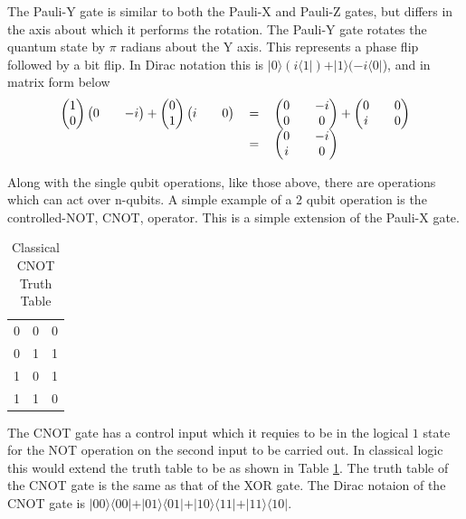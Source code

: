 \documentclass[authoryearcitations]{UoYCSproject}
\begin{document}
The Pauli-Y gate is similar to both the Pauli-X and Pauli-Z gates, but differs in the axis about which it performs the rotation.
The Pauli-Y gate rotates the quantum state by $\pi$ radians about the Y axis.
This represents a phase flip followed by a bit flip.
In Dirac notation this is $\vert0\rangle
(i\langle1\vert) + \vert1\rangle(-i\langle0\vert$), and in matrix form below
\begin{equation}
\begin{tabular}{ r c l }
\(\begin {pmatrix}
1 \\
0
\end{pmatrix}
\begin {pmatrix}
0 &&
-i
\end{pmatrix}
 + 
\begin {pmatrix}
0 \\
1
\end{pmatrix}
\begin {pmatrix}
i &&
0
\end{pmatrix}\)
& \(=\)
& \( 
\begin{pmatrix}
0 && -i \\
0 && 0
\end{pmatrix}
 + 
\begin{pmatrix}
0 && 0\\
i && 0
\end{pmatrix}
\) \\
& \(=\)
& \( 
\begin{pmatrix}
0 && -i \\
i && 0
\end{pmatrix}
\)
\end{tabular}
\end{equation}

Along with the single qubit operations, like those above, there are operations which can act over n-qubits.
A simple example of a 2 qubit operation is the controlled-NOT, CNOT, operator.
This is a simple extension of the Pauli-X gate.
\begin{table}
\centering
\begin{tabular}{ l | c || r | }
0 & 0 & 0 \\
0 & 1 & 1 \\
1 & 0 & 1 \\
1 & 1 & 0 \\ \end{tabular}
\caption{Classical CNOT Truth Table}
\label{CNOTTruthTable}
\end{table}
The CNOT gate has a control input which it requies to be in the logical $1$ state for the NOT operation on the second input to be carried out.
In classical logic this would extend the truth table to be as shown in Table \ref{CNOTTruthTable}.
The truth table of the CNOT gate is the same as that of the XOR gate.
The Dirac notaion of the CNOT gate is $\vert00\rangle\langle00\vert + \vert01\rangle\langle01\vert + \vert10\rangle\langle11\vert + \vert11\rangle\langle10\vert$.
\end{document}
